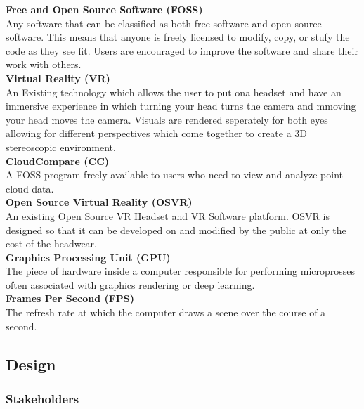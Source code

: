 {\parindent0pt
\textbf{Free and Open Source Software (FOSS)}\\

Any software that can be classified as both free software and open source software.
This means that anyone is freely licensed to modify, copy, or stufy the code as they see fit.
Users are encouraged to improve the software and share their work with others.\\

\textbf{Virtual Reality (VR)}\\

An Existing technology which allows the user to put ona headset and have an immersive experience in which turning your  head turns the camera and mmoving your head moves the camera.
Visuals are rendered seperately for both eyes allowing for different perspectives which come together to create a 3D stereoscopic environment.\\

\textbf{CloudCompare (CC)}\\

A FOSS program freely available to users who need to view and analyze point cloud data.\\

\textbf{Open Source Virtual Reality (OSVR)}\\

An existing Open Source VR Headset and VR Software platform.
OSVR is designed so that it can be developed on and modified by the public at only the cost of the headwear.\\

\textbf{Graphics Processing Unit (GPU)}\\

The piece of hardware inside a computer responsible for performing microprosses often associated with graphics rendering or deep learning.\\

\textbf{Frames Per Second (FPS)}\\

The refresh rate at which the computer draws a scene over the course of a second.\\
}

\subsection{Design}

\subsubsection{Stakeholders}

